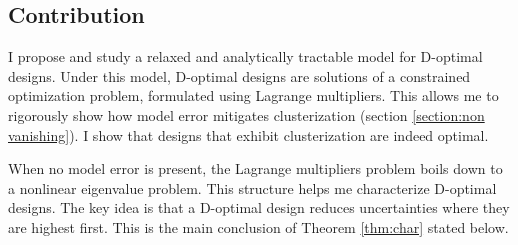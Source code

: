 \subsection{Contribution}
I propose and study a relaxed and analytically tractable model for
D-optimal designs. Under this model, D-optimal designs are solutions
of a constrained optimization problem, formulated using Lagrange
multipliers. This allows me to rigorously show how model error
mitigates clusterization (section \ref{section:non vanishing}). I show
that designs that exhibit clusterization are indeed optimal.


When no model error is present, the Lagrange multipliers problem boils
down to a nonlinear eigenvalue problem.
This structure helps me characterize D-optimal designs. The key idea
is that a D-optimal design reduces uncertainties where they are
highest first. This is the main conclusion of Theorem \ref{thm:char}
stated below.

